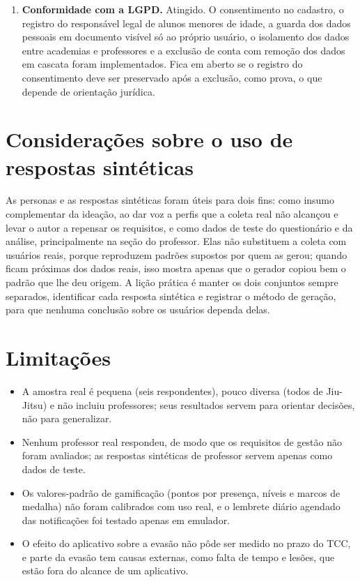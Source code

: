 \begin{enumerate}
        implementadas nas regras de segurança do banco de dados e
        cobertas por 288 testes automatizados.
  \item \textbf{Conformidade com a LGPD.} Atingido. O consentimento no
        cadastro, o registro do responsável legal de alunos menores de
        idade, a guarda dos dados pessoais em documento visível só ao
        próprio usuário, o isolamento dos dados entre academias e professores e a
        exclusão de conta com remoção dos dados em cascata foram
        implementados. Fica em aberto se o registro do consentimento deve
        ser preservado após a exclusão, como prova, o que depende de
        orientação jurídica.
\end{enumerate}

\section{Considerações sobre o uso de respostas sintéticas}

As personas e as respostas sintéticas foram úteis para dois fins: como
insumo complementar da ideação, ao dar voz a perfis que a coleta real não
alcançou e levar o autor a repensar os requisitos, e como dados de teste
do questionário e da análise, principalmente na seção do professor. Elas não substituem a coleta com
usuários reais, porque reproduzem padrões supostos por quem as gerou;
quando ficam próximas dos dados reais, isso mostra apenas que o gerador
copiou bem o padrão que lhe deu origem. A lição prática é manter os dois
conjuntos sempre separados, identificar cada resposta sintética e
registrar o método de geração, para que nenhuma conclusão sobre os
usuários dependa delas.

\section{Limitações}

\begin{itemize}
  \item A amostra real é pequena (seis respondentes), pouco diversa
        (todos de Jiu-Jitsu) e não incluiu professores; seus resultados
        servem para orientar decisões, não para generalizar.
  \item Nenhum professor real respondeu, de modo que os requisitos de
        gestão não foram avaliados; as respostas sintéticas de professor
        servem apenas como dados de teste.
  \item Os valores-padrão de gamificação (pontos por presença, níveis e
        marcos de medalha) não foram calibrados com uso real, e o lembrete
        diário agendado das notificações foi testado apenas em emulador.
  \item O efeito do aplicativo sobre a evasão não pôde ser medido no prazo
        do TCC, e parte da evasão tem causas externas, como falta de tempo
        e lesões, que estão fora do alcance de um aplicativo.
\end{itemize}

